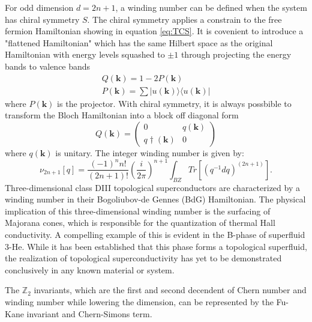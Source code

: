 For odd dimension $d=2n+1$, a winding number can be defined when the system has chiral symmetry $S$. The chiral symmetry applies a constrain to the free fermion Hamiltonian showing in equation \ref{eq:TCS}. It is covenient to introduce a "flattened Hamiltonian" which has the same Hilbert space as the original Hamiltonian with energy levels squashed to $\pm 1$ through projecting the energy bands to valence bands
\begin{align}
    Q(\mathbf{k})=1-2P(\mathbf{k})\\
    P(\mathbf{k}) = \sum|u(\mathbf{k})\rangle\langle u(\mathbf{k})|
\end{align}
where $P(\mathbf{k})$ is the projector.
With chiral symmetry, it is always possbible to transform the Bloch Hamiltonian into a block off diagonal form
\begin{equation}
    Q(\mathbf{k})= \begin{pmatrix}
0 & q(\mathbf{k}) \\
q\dagger(\mathbf{k}) & 0 
\end{pmatrix}
\end{equation}
where $q(\mathbf{k})$ is unitary. The integer winding number is given by:
\begin{equation}
    \nu_{2n+1}[q]=\frac{(-1)^nn!}{(2n+1)!}(\frac{i}{2\pi})^{n+1}\int_{BZ}Tr[(q^{-1}dq)^{(2n+1)}].
\end{equation}
Three-dimensional class DIII topological superconductors are characterized by a winding number in their Bogoliubov-de Gennes (BdG) Hamiltonian. The physical implication of this three-dimensional winding number is the surfacing of Majorana cones, which is responsible for the quantization of thermal Hall conductivity. A compelling example of this is evident in the B-phase of superfluid 3-He\cite{volovik2003universe,schnyder2008classification,qi2009time}. While it has been established that this phase forms a topological superfluid, the realization of topological superconductivity has yet to be demonstrated conclusively in any known material or system.

The $\mathbb{Z}_2$ invariants, which are the first and second decendent of Chern number and winding number while lowering the dimension, can be represented by the Fu-Kane invariant and Chern-Simons term.

